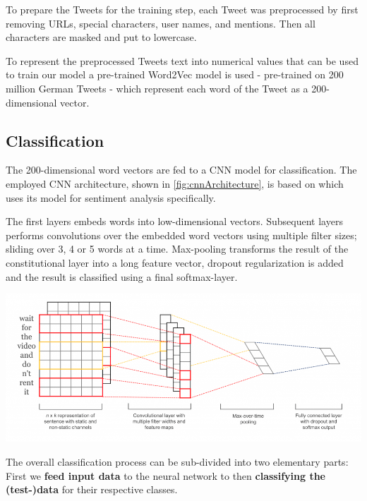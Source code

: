 \documentclass[10pt, oneside]{article}
\newenvironment{Figure}
	{\par\medskip\noindent\minipage{\linewidth}}
	{\endminipage\par\medskip}
\begin{document}
\begin{multicols}{2}
To prepare the Tweets for the training step, each Tweet was preprocessed by first removing URLs, special characters, user names, and mentions. Then all characters are masked and put to lowercase.

To represent the preprocessed Tweets text into numerical values that can be used to train our model a pre-trained Word2Vec model is used \cite{DBLP:journals/corr/abs-1301-3781} - pre-trained on 200 million German Tweets \cite{cieliebak2017twitter} - which represent each word of the Tweet as a 200-dimensional vector.

\subsection{Classification}

The 200-dimensional word vectors are fed to a CNN model for classification.
The employed CNN architecture, shown in \autoref{fig:cnnArchitecture},  is based on \cite{Kim2014} which uses its model for sentiment analysis specifically.

The first layers embeds words into low-dimensional vectors. Subsequent layers performs convolutions over the embedded word vectors using multiple filter sizes; sliding over 3, 4 or 5 words at a time. Max-pooling transforms the result of the constitutional layer into a long feature vector, dropout regularization is added and the result is classified using a final softmax-layer.

\begin{Figure}
	\centering
	\includegraphics[width=\linewidth]{images/cnn_architecture1.png}
	\label{fig:cnnArchitecture}
\end{Figure}

The overall classification process can be sub-divided into two elementary parts: First we \textbf{feed input data} to the neural network to then \textbf{classifying the (test-)data} for their respective classes.


\end{multicols}
\end{document}
